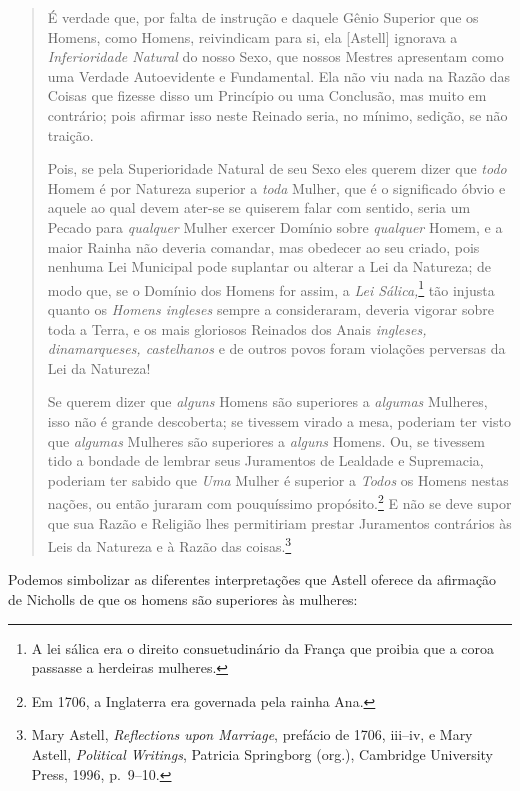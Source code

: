 \begin{quotation}
É verdade que, por falta de instrução e daquele Gênio Superior que os Homens, como Homens, reivindicam para si, ela [Astell] ignorava a \textit{Inferioridade Natural} do nosso Sexo, que nossos Mestres apresentam como uma Verdade Autoevidente e Fundamental. Ela não viu nada na Razão das Coisas que fizesse disso um Princípio ou uma Conclusão, mas muito em contrário; pois afirmar isso neste Reinado seria, no mínimo, sedição, se não traição.







Pois, se pela Superioridade Natural de seu Sexo eles querem dizer que \textit{todo} Homem é por Natureza superior a \textit{toda} Mulher, que é o significado óbvio e aquele ao qual devem ater-se se quiserem falar com sentido, seria um Pecado para \textit{qualquer} Mulher exercer Domínio sobre \textit{qualquer} Homem, e a maior Rainha não deveria comandar, mas obedecer ao seu criado, pois nenhuma Lei Municipal pode suplantar ou alterar a Lei da Natureza; de modo que, se o Domínio dos Homens for assim, a \textit{Lei Sálica,}\footnote{A lei sálica era o direito consuetudinário da França que proibia que a coroa passasse a herdeiras mulheres.} tão injusta quanto os \textit{Homens ingleses} sempre a consideraram, deveria vigorar sobre toda a Terra, e os mais gloriosos Reinados dos Anais \textit{ingleses, dinamarqueses, castelhanos} e de outros povos foram violações perversas da Lei da Natureza!













Se querem dizer que \textit{alguns} Homens são superiores a \textit{algumas} Mulheres, isso não é grande descoberta; se tivessem virado a mesa, poderiam ter visto que \textit{algumas} Mulheres são superiores a \textit{alguns} Homens. Ou, se tivessem tido a bondade de lembrar seus Juramentos de Lealdade e Supremacia, poderiam ter sabido que \textit{Uma} Mulher é superior a \textit{Todos} os Homens nestas nações, ou então juraram com pouquíssimo propósito.\footnote{Em 1706, a Inglaterra era governada pela rainha Ana.} E não se deve supor que sua Razão e Religião lhes permitiriam prestar Juramentos contrários às Leis da Natureza e à Razão das coisas.\footnote{Mary Astell, \textit{Reflections upon Marriage}, prefácio de 1706, iii--iv, e Mary Astell, \textit{Political Writings}, Patricia Springborg (org.), Cambridge University Press, 1996, p.~9--10.}












\end{quotation}
Podemos simbolizar as diferentes interpretações que Astell oferece da afirmação de Nicholls de que os homens são superiores às mulheres:

